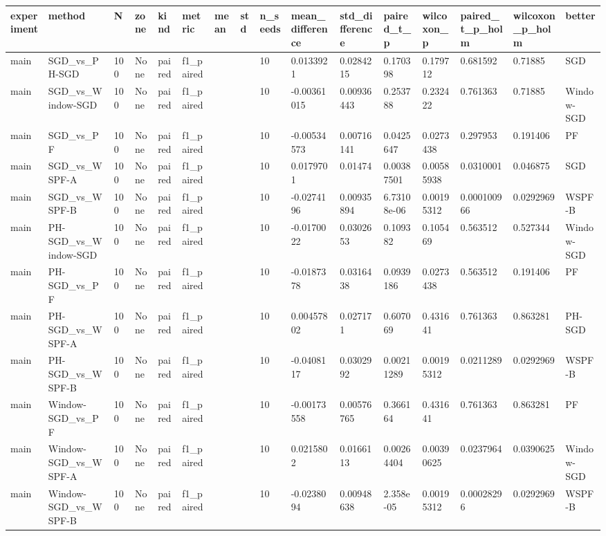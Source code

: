 \begin{tabular}{llllllllllllllll}
\hline
experiment & method & N & zone & kind & metric & mean & std & n\_seeds & mean\_difference & std\_difference & paired\_t\_p & wilcoxon\_p & paired\_t\_p\_holm & wilcoxon\_p\_holm & better \\
\hline
main & SGD\_vs\_PH-SGD & 100 & None & paired & f1\_paired &  &  & 10 & 0.0133921 & 0.0284215 & 0.170398 & 0.179712 & 0.681592 & 0.71885 & SGD \\
main & SGD\_vs\_Window-SGD & 100 & None & paired & f1\_paired &  &  & 10 & -0.00361015 & 0.00936443 & 0.253788 & 0.232422 & 0.761363 & 0.71885 & Window-SGD \\
main & SGD\_vs\_PF & 100 & None & paired & f1\_paired &  &  & 10 & -0.00534573 & 0.00716141 & 0.0425647 & 0.0273438 & 0.297953 & 0.191406 & PF \\
main & SGD\_vs\_WSPF-A & 100 & None & paired & f1\_paired &  &  & 10 & 0.0179701 & 0.01474 & 0.00387501 & 0.00585938 & 0.0310001 & 0.046875 & SGD \\
main & SGD\_vs\_WSPF-B & 100 & None & paired & f1\_paired &  &  & 10 & -0.0274196 & 0.00935894 & 6.73108e-06 & 0.00195312 & 0.000100966 & 0.0292969 & WSPF-B \\
main & PH-SGD\_vs\_Window-SGD & 100 & None & paired & f1\_paired &  &  & 10 & -0.0170022 & 0.0302653 & 0.109382 & 0.105469 & 0.563512 & 0.527344 & Window-SGD \\
main & PH-SGD\_vs\_PF & 100 & None & paired & f1\_paired &  &  & 10 & -0.0187378 & 0.0316438 & 0.0939186 & 0.0273438 & 0.563512 & 0.191406 & PF \\
main & PH-SGD\_vs\_WSPF-A & 100 & None & paired & f1\_paired &  &  & 10 & 0.00457802 & 0.027171 & 0.607069 & 0.431641 & 0.761363 & 0.863281 & PH-SGD \\
main & PH-SGD\_vs\_WSPF-B & 100 & None & paired & f1\_paired &  &  & 10 & -0.0408117 & 0.0302992 & 0.00211289 & 0.00195312 & 0.0211289 & 0.0292969 & WSPF-B \\
main & Window-SGD\_vs\_PF & 100 & None & paired & f1\_paired &  &  & 10 & -0.00173558 & 0.00576765 & 0.366164 & 0.431641 & 0.761363 & 0.863281 & PF \\
main & Window-SGD\_vs\_WSPF-A & 100 & None & paired & f1\_paired &  &  & 10 & 0.0215802 & 0.0166113 & 0.00264404 & 0.00390625 & 0.0237964 & 0.0390625 & Window-SGD \\
main & Window-SGD\_vs\_WSPF-B & 100 & None & paired & f1\_paired &  &  & 10 & -0.0238094 & 0.00948638 & 2.358e-05 & 0.00195312 & 0.00028296 & 0.0292969 & WSPF-B \\

\end{tabular}
